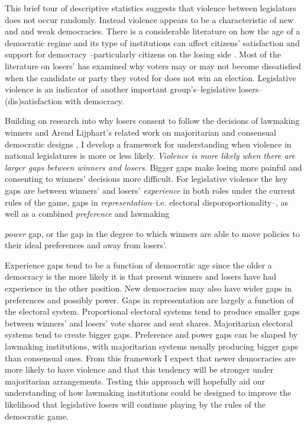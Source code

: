 \documentclass[a4paper]{article}\usepackage{graphicx, color}
\begin{document}
This brief tour of descriptive statistics suggests that violence between legislators does not occur randomly. Instead violence appears to be a characteristic of new and and weak democracies. There is a considerable literature on how the age of a democratic regime and its type of institutions can affect citizens' satisfaction and support for democracy \citep{Aarts2008, lijphart1999, Norris1999, Wagner2009}--particularly citizens on the losing side \citep{Anderson1997, Anderson2001, Anderson2005, Bernauer2011, Blais2007}. Most of the literature on losers' has examined why voters may or may not become dissatisfied when the candidate or party they voted for does not win an election. Legislative violence is an indicator of another important group's--legislative losers--(dis)satisfaction with democracy. 

Building on research into why losers consent to follow the decisions of lawmaking winners and Arend Lijphart's related work on majoritarian and consensual democratic designs \citeyearpar{Lijphart1977, Lijphart1984, Lijphart1991, lijphart1999, Lijphart2003, Lijphart2004}, I develop a framework for understanding when violence in national legislatures is more or less likely. {\emph{Violence is more likely when there are larger gaps between winners and losers.}} Bigger gaps make losing more painful and consenting to winners' decisions more difficult. For legislative violence the key gaps are between winners' and losers' {\emph{experience}} in both roles under the current rules of the game, gaps in {\emph{representation}}--i.e. electoral disporoportionality--, as well as a combined {\emph{preference}} and lawmaking {\emph{power} gap, or the gap in the degree to which winners are able to move policies to their ideal preferences and away from losers'. 

Experience gaps tend to be a function of democratic age since the older a democracy is the more likely it is that present winners and losers have had experience in the other position. New democracies may also have wider gaps in preferences and possibly power. Gaps in representation are largely a function of the electoral system. Proportional electoral systems tend to produce smaller gaps between winners' and losers' vote shares and seat shares. Majoritarian electoral systems tend to create bigger gaps. Preference and power gaps can be shaped by lawmaking institutions, with majoritarian systems usually producing bigger gaps than consensual ones. From this framework I expect that newer democracies are more likely to have violence and that this tendency will be stronger under majoritarian arrangements. Testing this approach will hopefully aid our understanding of how lawmaking institutions could be designed to improve the likelihood that legislative losers will continue playing by the rules of the democratic game.

}
\end{document}
